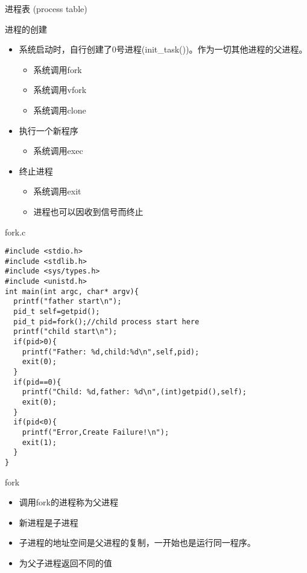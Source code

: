 \begin{frame}{进程表 (process table) }
\begin{center}\end{center}
\end{frame}

\begin{frame}{进程的创建}
\begin{itemize}
\item 系统启动时，自行创建了0号进程(init\_task())。作为一切其他进程的父进程。
\begin{itemize}
\item 系统调用fork
\item 系统调用vfork
\item 系统调用clone
\end{itemize}
\item 执行一个新程序
\begin{itemize}
\item 系统调用exec
\end{itemize}
\item 终止进程
\begin{itemize}
\item 系统调用exit
\item 进程也可以因收到信号而终止
\end{itemize}
\end{itemize}
\end{frame}



\def\lstlistingname{例}
\begin{frame}[containsverbatim]{fork.c}
\begin{lstlisting}
#include <stdio.h>
#include <stdlib.h>
#include <sys/types.h>
#include <unistd.h>
int main(int argc, char* argv){
  printf("father start\n");
  pid_t self=getpid();
  pid_t pid=fork();//child process start here
  printf("child start\n");
  if(pid>0){
    printf("Father: %d,child:%d\n",self,pid);
    exit(0);
  }
  if(pid==0){
    printf("Child: %d,father: %d\n",(int)getpid(),self);
    exit(0);
  }
  if(pid<0){
    printf("Error,Create Failure!\n");
    exit(1);
  }
}
\end{lstlisting}
\end{frame}


\begin{frame}{fork}
\begin{itemize}
\item 调用fork的进程称为父进程
\item 新进程是子进程
\item 子进程的地址空间是父进程的复制，一开始也是运行同一程序。
\item 为父子进程返回不同的值
\end{itemize}
\end{frame}

